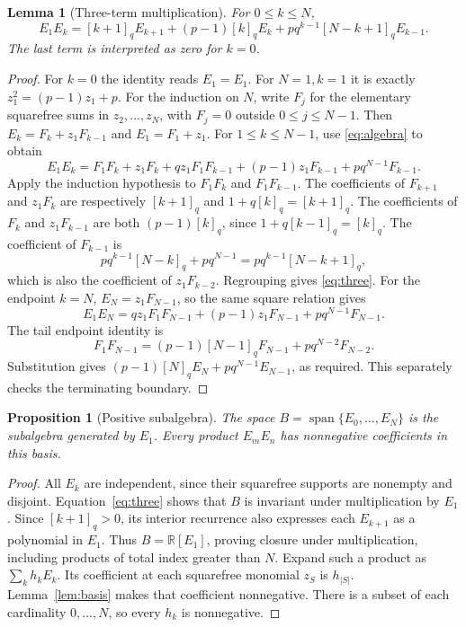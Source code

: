 \documentclass[11pt]{article}
\newtheorem{lemma}[theorem]{Lemma}
\newtheorem{proposition}[theorem]{Proposition}
\begin{document}
\begin{lemma}[Three-term multiplication]\label{lem:three}
For $0\leq k\leq N$,
\begin{equation}\label{eq:three}
E_1E_k=[k+1]_qE_{k+1}+(p-1)[k]_qE_k+
pq^{k-1}[N-k+1]_qE_{k-1}.
\end{equation}
The last term is interpreted as zero for $k=0$.
\end{lemma}
\begin{proof}
For $k=0$ the identity reads $E_1=E_1$. For $N=1,k=1$ it is exactly $z_1^2=(p-1)z_1+p$.
For the induction on $N$, write $F_j$ for the elementary squarefree sums in $z_2,\ldots,z_N$, with $F_j=0$ outside $0\leq j\leq N-1$. Then $E_k=F_k+z_1F_{k-1}$ and $E_1=F_1+z_1$. For $1\leq k\leq N-1$, use \eqref{eq:algebra} to obtain
\[
E_1E_k=F_1F_k+z_1F_k+qz_1F_1F_{k-1}
 +(p-1)z_1F_{k-1}+pq^{N-1}F_{k-1}.
\]
Apply the induction hypothesis to $F_1F_k$ and $F_1F_{k-1}$. The coefficients of $F_{k+1}$ and $z_1F_k$ are respectively $[k+1]_q$ and $1+q[k]_q=[k+1]_q$. The coefficients of $F_k$ and $z_1F_{k-1}$ are both $(p-1)[k]_q$, since $1+q[k-1]_q=[k]_q$. The coefficient of $F_{k-1}$ is
\[
pq^{k-1}[N-k]_q+pq^{N-1}=pq^{k-1}[N-k+1]_q,
\]
which is also the coefficient of $z_1F_{k-2}$. Regrouping gives \eqref{eq:three}.
For the endpoint $k=N$, $E_N=z_1F_{N-1}$, so the same square relation gives
\[
E_1E_N=qz_1F_1F_{N-1}+(p-1)z_1F_{N-1}+pq^{N-1}F_{N-1}.
\]
The tail endpoint identity is
\[
F_1F_{N-1}=(p-1)[N-1]_qF_{N-1}+pq^{N-2}F_{N-2}.
\]
Substitution gives $(p-1)[N]_qE_N+pq^{N-1}E_{N-1}$, as required. This separately checks the terminating boundary.
\end{proof}

\begin{proposition}[Positive subalgebra]\label{prop:subalgebra}
The space $B=\operatorname{span}\{E_0,\ldots,E_N\}$ is the subalgebra generated by $E_1$. Every product $E_mE_n$ has nonnegative coefficients in this basis.
\end{proposition}
\begin{proof}
All $E_k$ are independent, since their squarefree supports are nonempty and disjoint. Equation~\eqref{eq:three} shows that $B$ is invariant under multiplication by $E_1$. Since $[k+1]_q>0$, its interior recurrence also expresses each $E_{k+1}$ as a polynomial in $E_1$. Thus $B=\mathbb R[E_1]$, proving closure under multiplication, including products of total index greater than $N$.
Expand such a product as $\sum_k h_kE_k$. Its coefficient at each squarefree monomial $z_S$ is $h_{|S|}$. Lemma~\ref{lem:basis} makes that coefficient nonnegative. There is a subset of each cardinality $0,\ldots,N$, so every $h_k$ is nonnegative.
\end{proof}
\end{document}
